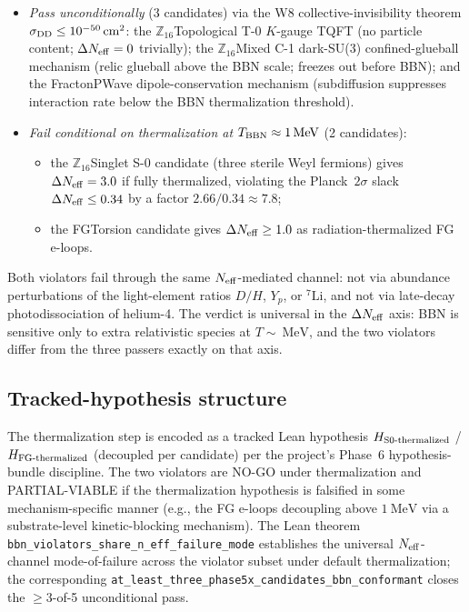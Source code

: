 \documentclass[aps,prd,reprint,nofootinbib,superscriptaddress]{revtex4-2}
\begin{document}
\begin{itemize}
\item \emph{Pass unconditionally} (3 candidates) via the W8
  collective-invisibility theorem $\sigma_{\rm DD} \leq 10^{-50}\,\text{cm}^2$:
  the $\mathbb{Z}_{16}$Topological T-0 $K$-gauge TQFT (no particle
  content; $\Delta N_{\rm eff} = 0$ trivially); the $\mathbb{Z}_{16}$Mixed
  C-1 dark-SU(3) confined-glueball mechanism (relic glueball above the
  BBN scale; freezes out before BBN); and the FractonPWave dipole-conservation
  mechanism (subdiffusion suppresses interaction rate below the BBN
  thermalization threshold).
\item \emph{Fail conditional on thermalization at $T_{\rm BBN} \approx
  \SI{1}{\mega\electronvolt}$} (2 candidates):
  \begin{itemize}
  \item the $\mathbb{Z}_{16}$Singlet S-0 candidate (three sterile Weyl
    fermions) gives $\Delta N_{\rm eff} = 3.0$ if fully thermalized,
    violating the Planck~$2\sigma$ slack $\Delta N_{\rm eff} \leq 0.34$
    by a factor $2.66 / 0.34 \approx 7.8$;
  \item the FGTorsion candidate gives $\Delta N_{\rm eff} \geq 1.0$ as
    radiation-thermalized FG e-loops.
  \end{itemize}
\end{itemize}

Both violators fail through the same $N_{\rm eff}$-mediated channel:
not via abundance perturbations of the light-element ratios
$D/H$, $Y_p$, or ${}^7\!\text{Li}$, and not via late-decay
photodissociation of helium-4. The verdict is universal in the
$\Delta N_{\rm eff}$ axis: BBN is sensitive only to extra
relativistic species at $T \sim \SI{}{\mega\electronvolt}$, and the
two violators differ from the three passers exactly on that axis.

\subsection{Tracked-hypothesis structure}
\label{subsec:bbn-hypothesis}

The thermalization step is encoded as a tracked Lean hypothesis
$H_{\rm S0\text{-}thermalized}$ / $H_{\rm FG\text{-}thermalized}$
(decoupled per candidate) per the project's Phase~6 hypothesis-bundle
discipline. The two violators are NO-GO under thermalization and
PARTIAL-VIABLE if the thermalization hypothesis is falsified in some
mechanism-specific manner (e.g., the FG e-loops decoupling above
$\SI{1}{\mega\electronvolt}$ via a substrate-level kinetic-blocking
mechanism). The Lean theorem
\texttt{bbn\_violators\_share\_n\_eff\_failure\_mode} establishes the
universal $N_{\rm eff}$-channel mode-of-failure across the violator
subset under default thermalization; the corresponding
\texttt{at\_least\_three\_phase5x\_candidates\_bbn\_conformant} closes the
$\geq 3$-of-5 unconditional pass.
\end{document}
